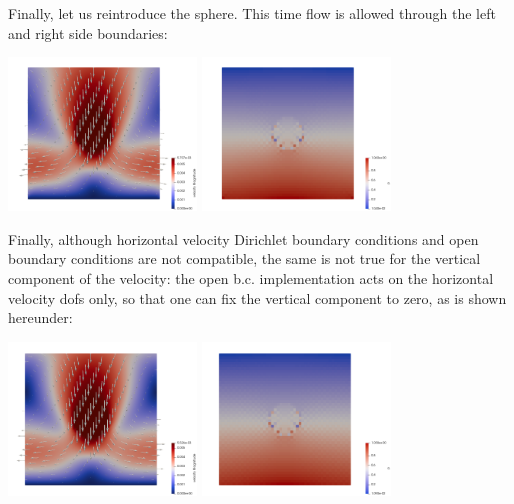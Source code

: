 Finally, let us reintroduce the sphere. This 
time flow is allowed through the left and right side boundaries:

\begin{center}
\includegraphics[width=5cm]{python_codes/fieldstone_29/results/sphere_openbc/vel}
\includegraphics[width=5cm]{python_codes/fieldstone_29/results/sphere_openbc/p}
\end{center}

Finally, although horizontal velocity Dirichlet boundary conditions and open 
boundary conditions are not compatible, the same is not true for the vertical component 
of the velocity: the open b.c. implementation acts on the horizontal velocity 
dofs only, so that one can fix the vertical component to zero, as is shown hereunder:

\begin{center}
\includegraphics[width=5cm]{python_codes/fieldstone_29/results/sphere_openbc_v0/vel}
\includegraphics[width=5cm]{python_codes/fieldstone_29/results/sphere_openbc_v0/p}
\end{center}

